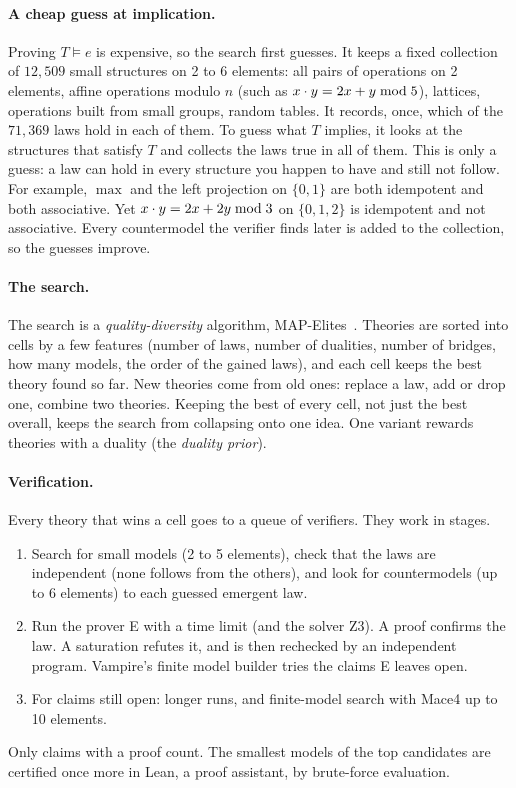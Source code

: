 \documentclass[11pt,a4paper]{article}
\begin{document}
\paragraph{A cheap guess at implication.} Proving $T\models e$ is expensive, so the search first guesses. It keeps a
fixed collection of $12{,}509$ small structures on 2 to 6 elements: all pairs of operations on 2 elements, affine
operations modulo $n$ (such as $x\cdot y=2x+y\bmod 5$), lattices, operations built from small groups, random tables. It records, once, which of the $71{,}369$
laws hold in each of them. To guess what $T$ implies, it looks at the structures that satisfy $T$ and collects the
laws true in all of them. This is only a guess: a law can hold in every structure you
happen to have and still not follow. For example, $\max$ and the left projection on $\{0,1\}$ are both idempotent and
both associative. Yet $x\cdot y=2x+2y\bmod 3$ on $\{0,1,2\}$ is idempotent and not associative. Every countermodel the verifier finds later is added to the collection,
so the guesses improve.

\paragraph{The search.} The search is a \emph{quality-diversity} algorithm, MAP-Elites~\cite{mapelites}. Theories are
sorted into cells by a few features (number of laws, number of dualities, number of bridges, how many models, the
order of the gained laws), and each cell keeps the best theory found so far. New theories come from old ones: replace
a law, add or drop one, combine two theories. Keeping the best of every cell, not just the best overall, keeps the
search from collapsing onto one idea. One variant rewards theories with a duality (the \emph{duality prior}).

\paragraph{Verification.} Every theory that wins a cell goes to a queue of verifiers. They work in stages.
\begin{enumerate}
\item Search for small models (2 to 5 elements), check that the laws are independent (none follows from the
  others), and look for countermodels
  (up to 6 elements) to each guessed emergent law.
\item Run the prover E with a time limit (and the solver Z3). A proof confirms the law. A saturation refutes it, and
  is then rechecked by an independent program. Vampire's finite model builder tries the claims E leaves open.
\item For claims still open: longer runs, and finite-model search with Mace4 up to 10 elements.
\end{enumerate}
Only claims with a proof count. The smallest models of the top candidates are certified once more in Lean, a proof
assistant, by brute-force evaluation.
\end{document}
